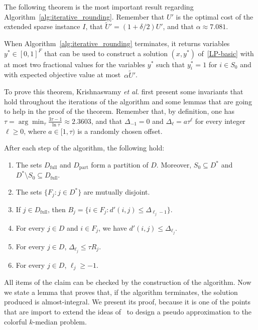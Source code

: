 The following theorem is the most important result regarding {Algorithm~\ref{alg:iterative_rounding}}. Remember that $U'$ is the optimal cost of the extended sparse instance $I$, that ${\tilde{U}' = (1 + \delta/2)U'}$, and that $\alpha \approx 7.081$.

\begin{theorem} \label{thm:solution_iter}
    When {\rm Algorithm~\ref{alg:iterative_rounding}} terminates, it returns variables $y^* \in [0,1]^{F}$ that can be used to construct a solution $(x,y^*)$ of~\eqref{LP-basic} with at most two fractional values for the variables $y^*$ such that $y^*_i = 1$ for $i \in S_0$ and with expected objective value at most~$\alpha \tilde{U}'$.  
\end{theorem}

To prove this theorem, Krishnaswamy \emph{et al.} first present some invariants that hold throughout the iterations of the algorithm and some lemmas that are going to help in the proof of the theorem. Remember that, by definition, one has $\tau = \arg\min_{\tau} \frac{3\tau-1}{\ln \tau} \approx 2.3603$, and that $\Delta_{-1} = 0$ and $\Delta_\ell = a\tau^\ell$ for every integer $\ell \ge 0$, where $a \in [1, \tau)$ is a randomly chosen offset.

\begin{claim} \label{claim:iter_invariants}
After each step of the algorithm, the following hold:
\begin{enumerate}
    \item The sets $D_\text{full}$ and $D_\text{part}$ form a partition of $D$. Moreover, $S_0 \subseteq D^*$ and $D^* \setminus S_0 \subseteq D_\text{full}$.
    \item The sets $\{F_j : j \in D^*\}$ are mutually disjoint.
    \item If $j \in D_\text{full}$, then $B_j = \{i \in F_j : d'(i,j) \le \Delta_{\ell_j-1}\}$.
    \item For every $j \in D$ and $i \in F_j$, we have $d'(i,j) \le \Delta_{\ell_j}$.
    \item For every $j \in D$, $\Delta_{\ell_j} \le \tau R_j$.
    \item For every $j \in D$, $\ell_j \ge -1$.
\end{enumerate}
\end{claim}
All items of the claim can be checked by the construction of the algorithm. Now we state a lemma that proves that, if the algorithm terminates, the solution produced is almost-integral. We present its proof, because it is one of the points that are import to extend the ideas of~\cite{KLS2018} to design a pseudo approximation to the colorful $k$-median problem.


